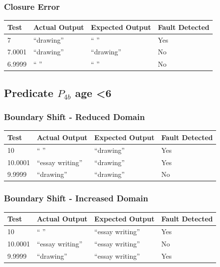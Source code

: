 \documentclass[11pt, oneside]{article}   	%
\begin{document}
\subsubsection{Closure Error}
\begin{table}[!htb]
\centering
\begin{tabular}{|l|l|l|l|}
\hline
Test   & Actual Output & Expected Output & Fault Detected \\ \hline
7      & “drawing”     & “ ”             & Yes            \\ \hline
7.0001 & “drawing”     & “drawing”       & No             \\ \hline
6.9999 & “ ”           & “ ”             & No             \\ \hline
\end{tabular}
\end{table}
\newpage

\subsection{Predicate $P_{4b}$ age \textless 6}
\subsubsection{Boundary Shift - Reduced Domain}
\begin{table}[!htb]
\centering
\begin{tabular}{|l|l|l|l|}
\hline
Test    & Actual Output   & Expected Output & Fault Detected \\ \hline
10      & “ ”             & “drawing”       & Yes            \\ \hline
10.0001 & “essay writing” & “drawing”       & Yes            \\ \hline
9.9999  & “drawing”       & “drawing”       & No             \\ \hline
\end{tabular}
\end{table}

\subsubsection{Boundary Shift - Increased Domain}
\begin{table}[!htb]
\centering
\begin{tabular}{|l|l|l|l|}
\hline
Test    & Actual Output   & Expected Output & Fault Detected \\ \hline
10      & “ ”             & “essay writing” & Yes            \\ \hline
10.0001 & “essay writing” & “essay writing” & No             \\ \hline
9.9999  & “drawing”       & “essay writing” & Yes            \\ \hline
\end{tabular}
\end{table}
\end{document}
